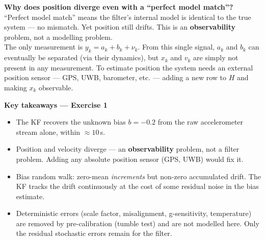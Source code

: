 \documentclass[12pt, a4paper]{article}
\begin{document}
\begin{warnbox}
  \textbf{Why does position diverge even with a ``perfect model match''?}\\
  ``Perfect model match'' means the filter's internal model is identical
  to the true system --- no mismatch.
  Yet position still drifts.
  This is an \textbf{observability} problem, not a modelling problem.\\[4pt]
  The only measurement is $y_k = a_k + b_k + \nu_k$.
  From this single signal, $a_k$ and $b_k$ can eventually be separated
  (via their dynamics), but $x_k$ and $v_k$ are simply not
  present in any measurement.
  To estimate position the system needs an external position sensor ---
  GPS, UWB, barometer, etc. --- adding a new row to $H$ and making
  $x_k$ observable.
\end{warnbox}

\begin{keybox}
  \textbf{Key takeaways --- Exercise 1}
  \begin{itemize}[leftmargin=1.4em, topsep=2pt]
    \item The KF recovers the unknown bias $b = -0.2$ from the raw
          accelerometer stream alone, within $\approx 10$\,s.
    \item Position and velocity diverge --- an \textbf{observability}
          problem, not a filter problem.
          Adding any absolute position sensor (GPS, UWB) would fix it.
    \item Bias random walk: zero-mean \emph{increments} but non-zero
          accumulated drift.
          The KF tracks the drift continuously at the cost of some
          residual noise in the bias estimate.
    \item Deterministic errors (scale factor, misalignment,
          g-sensitivity, temperature) are removed by pre-calibration
          (tumble test) and are not modelled here.
          Only the residual stochastic errors remain for the filter.
  \end{itemize}
\end{keybox}
\end{document}
